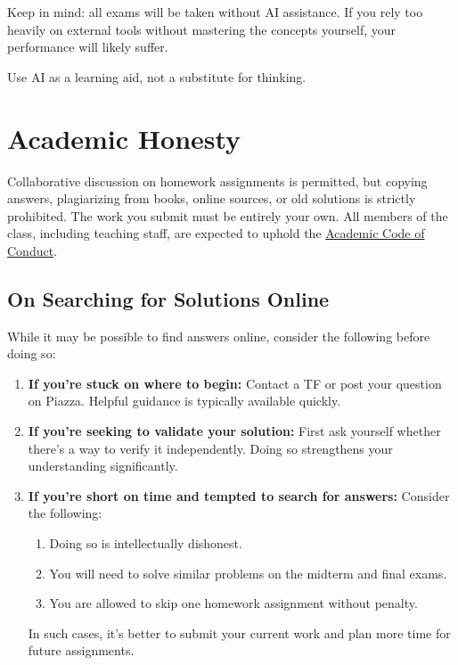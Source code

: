 \documentclass[11pt]{article}
\begin{document}
Keep in mind: all exams will be taken without AI assistance. If you rely too heavily on external tools without mastering the concepts yourself, your performance will likely suffer.

Use AI as a learning aid, not a substitute for thinking.

\section*{Academic Honesty}

Collaborative discussion on homework assignments  is permitted, but copying answers, plagiarizing from books, online sources, or old solutions is strictly prohibited. The work you submit must be entirely your own. All members of the class, including teaching staff, are expected to uphold the 
\href{http://www.bu.edu/dos/policies/student-responsibilities/}{Academic Code of Conduct}.

\subsection*{On Searching for Solutions Online}

While it may be possible to find answers online, consider the following before doing so:

\begin{enumerate}
    \item \textbf{If you're stuck on where to begin:} 
    Contact a TF or post your question on Piazza. Helpful guidance is typically available quickly.

    \item \textbf{If you're seeking to validate your solution:}
    First ask yourself whether there's a way to verify it independently. Doing so strengthens your understanding significantly.

    \item \textbf{If you're short on time and tempted to search for answers:}
    Consider the following:
    \begin{enumerate}
        \item Doing so is intellectually dishonest.
        \item You will need to solve similar problems on the midterm and final exams.
        \item You are allowed to skip one homework assignment without penalty.
    \end{enumerate}
    In such cases, it's better to submit your current work and plan more time for future assignments.
\end{enumerate}
\end{document}

